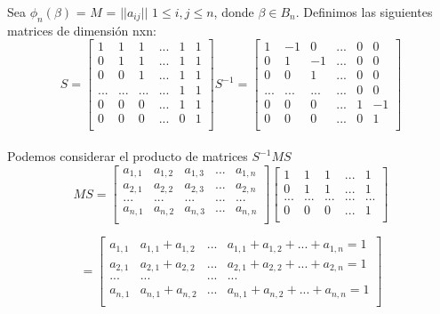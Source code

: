 \newpage
Sea $\phi_{n}(\beta)$ = $M$ = $||a_{ij}||$ $1 \le i,j \le n$, donde $\beta \in B_{n}$. Definimos las siguientes matrices de dimensión nxn:\\
  \[ S = \begin{bmatrix}
  1 & 1 & 1 &... & 1 & 1 \\
  0 & 1 & 1 &... & 1 & 1\\
  0 & 0 & 1 &... & 1 & 1 \\
  ... & ... & ...& ... & 1 & 1 \\	
  0 & 0 & 0 & ... & 1 & 1\\	
  0 & 0 & 0 & ... & 0 & 1\\
  \end{bmatrix} 
  S^{-1} = \begin{bmatrix}
  1 & -1 & 0 & ... & 0 & 0 \\
  0 & 1 & -1 & ... & 0 & 0\\
  0 & 0 & 1 & ... & 0  & 0\\
  ... & ... & ...& ... & 0 & 0  \\	
  0 & 0 & 0 &...& 1 & -1  \\	
  0 & 0 & 0 & ... & 0 & 1 \\
  \end{bmatrix}\]\\
  
 Podemos considerar el producto de matrices $S^{-1}MS$
   \[ M S = \begin{bmatrix}
   a_{1,1} & a_{1,2} & a_{1,3} &... & a_{1,n} \\
   a_{2,1} & a_{2,2} & a_{2,3} &...  & a_{2,n}\\
   ... & ... & ...& ... & ... \\		
   a_{n,1} & a_{n,2} & a_{n,3} & ... & a_{n,n}\\
   \end{bmatrix} 
   \begin{bmatrix}
   1 & 1 & 1 &... & 1  \\
   0 & 1 & 1 &... & 1 \\
   ... & ... & ...& ... & ... \\	
   0 & 0 & 0 & ... & 1\\
   \end{bmatrix}\]
   
   \[= \begin{bmatrix}
   a_{1,1} & a_{1,1}+a_{1,2} & ... & a_{1,1} + a_{1,2}+...+a_{1,n} = 1  \\
   a_{2,1} & a_{2,1}+a_{2,2} &... & a_{2,1} + a_{2,2}+...+a_{2,n} = 1  \\
   ... & ... & ... & ... \\	
   a_{n,1} & a_{n,1}+a_{n,2} & ... & a_{n,1} + a_{n,2}+...+a_{n,n} = 1 \\
   \end{bmatrix}\]\\
  

